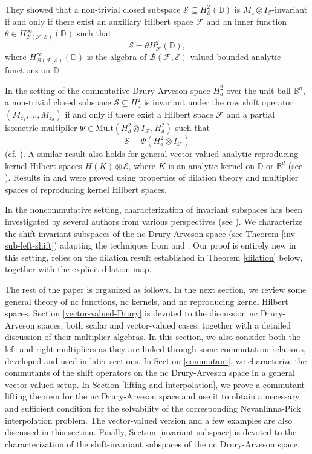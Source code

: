 \documentclass[12pt]{amsart}%
\numberwithin{equation}{section}
\newcommand{\bB}{\mathbb{B}}
\newcommand{\clb}{\mathcal{B}}
\newcommand{\cle}{\mathcal{E}}
\newcommand{\clf}{\mathcal{F}}
\newcommand{\cls}{\mathcal{S}}
\newcommand{\D}{\mathbb{D}}
\begin{document}
They showed that a non-trivial closed subspace $\cls\subseteq H_{\cle}^2(\D)$ is $M_{z}\otimes I_{\cle}$-invariant if and only if there exist an auxiliary Hilbert space $\clf$ and an inner function $\theta\in H_{\clb(\clf,\cle)}^{\infty}(\D)$ such that
\[
\cls=\theta H_{\clf}^2(\D),
\]
where $H_{\clb(\clf,\cle)}^{\infty}(\D)$ is the algebra of $\clb(\clf,\cle)$-valued bounded analytic functions on $\D$.
 
In the setting of the commutative Drury-Arveson space $H_d^2$ over the unit ball $\bB^n$, a non-trivial closed subspace $\cls \subseteq H_d^2$ is invariant under the row shift operator $(M_{z_1},\ldots, M_{z_d})$ if and only if there exist a Hilbert space $\clf$ and a partial isometric multiplier $\Psi\in \text{Mult}(H_d^2\otimes I_{\clf}, H_d^2)$ such that
\[
\cls=\Psi (H_d^2\otimes I_{\clf})
\]
(cf. \cite{GRS, MT, Sarkar-II}). A similar result also holds for general vector-valued analytic reproducing kernel Hilbert spaces $H(K)\otimes \cle$, where $K$ is an analytic kernel on $\D$ or $\bB^d$ (see \cite{Sarkar-I,Sarkar-II, MT}). Results in \cite{Sarkar-I} and \cite{Sarkar-II} were proved using properties of dilation theory and multiplier spaces of reproducing kernel Hilbert spaces. 

In the noncommutative setting, characterization of invariant subspaces  has been investigated by several authors from various perspectives (see \cite{BV22, MS, Po89, P10, P18}).
 We characterize the shift-invariant subspaces of the nc Drury-Arveson space (see Theorem \ref{inv-sub-left-shift}) adapting the techniques from \cite{Sarkar-I} and \cite{Sarkar-II}. Our proof is entirely new in this setting, relies on the dilation result established in Theorem \ref{dilation} below, together with the explicit dilation map. 

The rest of the paper is organized as follows. In the next section, we review some general theory of nc functions, nc kernels, and nc reproducing kernel Hilbert spaces. Section \ref{vector-valued-Drury} is devoted to the discussion  nc Drury-Arveson spaces, both scalar and vector-valued cases, together with a detailed discussion of their multiplier algebras. In this section, we also consider both the left and right multipliers as they are linked through some commutation relations, developed and used in later sections. In Section \ref{commutant}, we characterize the commutants of the shift operators on the nc Drury-Arveson space in a general vector-valued setup. In Section \ref{lifting and interpolation}, we prove a commutant lifting theorem for the nc Drury-Arveson space and use it to obtain a necessary and sufficient condition for the solvability of the corresponding Nevanlinna-Pick interpolation problem. The vector-valued version and a few examples are also discussed in this section. Finally, Section \ref{invariant subspace} is devoted to the characterization of the shift-invariant subspaces of the nc Drury-Arveson space.
\end{document}
